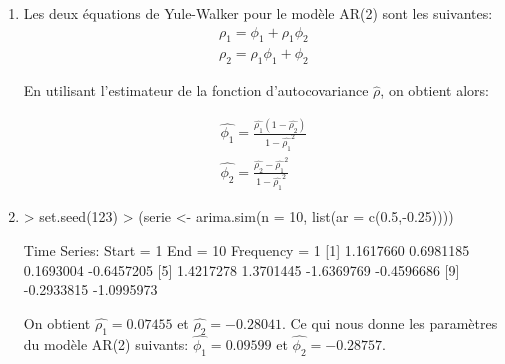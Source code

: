 \begin{solution}{2.6}
  \begin{enumerate}
\item
Les deux équations de Yule-Walker pour le modèle AR(2) sont les suivantes:
\begin{align*}
\rho_1 = \phi_1 + \rho_1 \phi_2 \\
\rho_2 = \rho_1\phi_1 + \phi_2
\end{align*}

En utilisant l'estimateur de la fonction d'autocovariance $\hat{\rho}$, on obtient alors:

\begin{align*}
\hat{\phi_1} = \frac{\hat{\rho_1}(1-\hat{\rho_2})}{1-\hat{\rho_1}^2} \\
\hat{\phi_2} = \frac{\hat{\rho_2} - \hat{\rho_1}^2}{1-\hat{\rho_1}^2}
\end{align*}


\item

\begin{Schunk}
\begin{Sinput}
> set.seed(123)
> (serie <- arima.sim(n = 10, list(ar = c(0.5,-0.25))))
\end{Sinput}
\begin{Soutput}
Time Series:
Start = 1
End = 10
Frequency = 1
 [1]  1.1617660  0.6981185  0.1693004 -0.6457205
 [5]  1.4217278  1.3701445 -1.6369769 -0.4596686
 [9] -0.2933815 -1.0995973
\end{Soutput}
\end{Schunk}

On obtient $ = 0.07455$ et $ = -0.28041$.
Ce qui nous donne les paramètres du modèle AR(2) suivants:
$ = 0.09599$ et
$ = -0.28757$.
\end{enumerate}
\end{solution}
